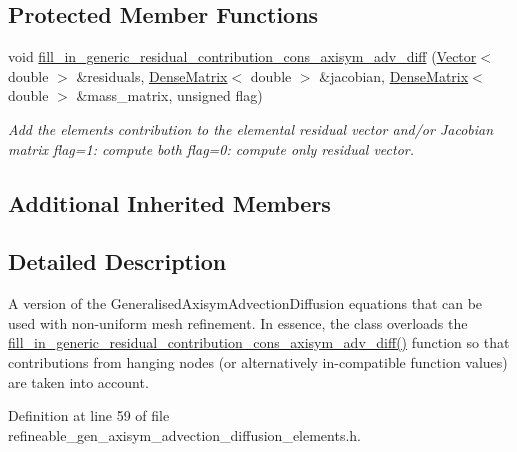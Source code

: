 \subsection*{Protected Member Functions}
\begin{DoxyCompactItemize}
\item 
void \hyperlink{classoomph_1_1RefineableGeneralisedAxisymAdvectionDiffusionEquations_ac8c288d66e8d577940a4a4ee9c6ebab9}{fill\+\_\+in\+\_\+generic\+\_\+residual\+\_\+contribution\+\_\+cons\+\_\+axisym\+\_\+adv\+\_\+diff} (\hyperlink{classoomph_1_1Vector}{Vector}$<$ double $>$ \&residuals, \hyperlink{classoomph_1_1DenseMatrix}{Dense\+Matrix}$<$ double $>$ \&jacobian, \hyperlink{classoomph_1_1DenseMatrix}{Dense\+Matrix}$<$ double $>$ \&mass\+\_\+matrix, unsigned flag)
\begin{DoxyCompactList}\small\item\em Add the element\textquotesingle{}s contribution to the elemental residual vector and/or Jacobian matrix flag=1\+: compute both flag=0\+: compute only residual vector. \end{DoxyCompactList}\end{DoxyCompactItemize}
\subsection*{Additional Inherited Members}


\subsection{Detailed Description}
A version of the Generalised\+Axisym\+Advection\+Diffusion equations that can be used with non-\/uniform mesh refinement. In essence, the class overloads the \hyperlink{classoomph_1_1RefineableGeneralisedAxisymAdvectionDiffusionEquations_ac8c288d66e8d577940a4a4ee9c6ebab9}{fill\+\_\+in\+\_\+generic\+\_\+residual\+\_\+contribution\+\_\+cons\+\_\+axisym\+\_\+adv\+\_\+diff()} function so that contributions from hanging nodes (or alternatively in-\/compatible function values) are taken into account. 

Definition at line 59 of file refineable\+\_\+gen\+\_\+axisym\+\_\+advection\+\_\+diffusion\+\_\+elements.\+h.




